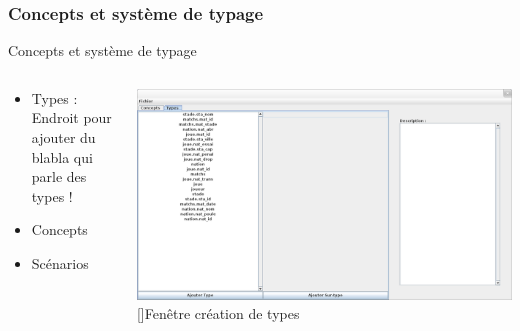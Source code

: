 \documentclass[8pt]{beamer}
\begin{document}
\subsubsection{Concepts et système de typage}
\begin{frame}{Concepts et système de typage}
\begin{columns}

\begin{column}{6cm}
\begin{itemize}
\item Types :
\\ Endroit pour ajouter du blabla qui parle des types !
\item Concepts
\item Scénarios
\end{itemize}
\end{column}

\begin{column}{6cm}
\includegraphics[scale=0.135]{creation_types.png}
[]{Fenêtre création de types}
\end{column}

\end{columns}
\end{frame}
\end{document}
